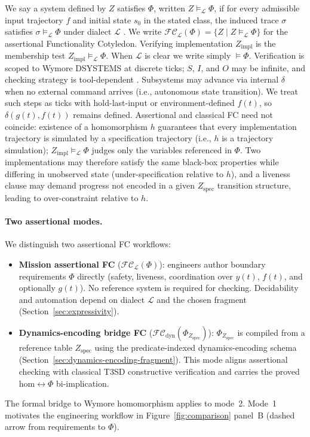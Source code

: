 We say a system defined by $Z$ satisfies $\Phi$, written $Z \models_{\mathcal{L}} \Phi$, if for every admissible input trajectory $f$ and initial state $s_0$ in the stated class, the induced trace $\sigma$ satisfies $\sigma \models_{\mathcal{L}} \Phi$ under dialect $\mathcal{L}$ \parencite{Pnueli1977,BaierKatoen2008}. We write $\mathcal{FC}_{\mathcal{L}}(\Phi) = \{ Z \mid Z \models_{\mathcal{L}} \Phi \}$ for the assertional Functionality Cotyledon. Verifying implementation $Z_{\text{impl}}$ is the membership test $Z_{\text{impl}} \models_{\mathcal{L}} \Phi$. When $\mathcal{L}$ is clear we write simply $\models \Phi$. Verification is scoped to Wymore DSYSTEMS at discrete ticks; $S$, $I$, and $O$ may be infinite, and checking strategy is tool-dependent \parencite{Wymore1993,BaierKatoen2008}. Subsystems may advance via internal $\delta$ when no external command arrives (i.e., autonomous state transition).  We treat such steps as ticks with hold-last-input or environment-defined $f(t)$, so $\delta(g(t), f(t))$ remains defined. Assertional and classical FC need not coincide: existence of a homomorphism $h$ guarantees that every implementation trajectory is simulated by a specification trajectory (i.e., $h$ is a trajectory simulation); $Z_{\text{impl}} \models_{\mathcal{L}} \Phi$ judges only the variables referenced in $\Phi$. Two implementations may therefore satisfy the same black-box properties while differing in unobserved state (under-specification relative to $h$), and a liveness clause may demand progress not encoded in a given $Z_{\text{spec}}$ transition structure, leading to over-constraint relative to $h$.

\paragraph{Two assertional modes.}
\label{sec:assertional-modes}
We distinguish two assertional FC workflows:
\begin{itemize}
    \item \textbf{Mission assertional FC} ($\mathcal{FC}_{\mathcal{L}}(\Phi)$): engineers author boundary requirements $\Phi$ directly (safety, liveness, coordination over $y(t)$, $f(t)$, and optionally $g(t)$). No reference system is required for checking. Decidability and automation depend on dialect $\mathcal{L}$ and the chosen fragment (Section~\ref{sec:expressivity}).
    \item \textbf{Dynamics-encoding bridge FC} ($\mathcal{FC}_{\mathrm{dyn}}(\Phi_{Z_{\text{spec}}})$): $\Phi_{Z_{\text{spec}}}$ is compiled from a reference table $Z_{\text{spec}}$ using the predicate-indexed dynamics-encoding schema (Section~\ref{sec:dynamics-encoding-fragment}). This mode aligns assertional checking with classical T3SD constructive verification and carries the proved hom$\leftrightarrow\Phi$ bi-implication.
\end{itemize}
The formal bridge to Wymore homomorphism applies to mode~2. Mode~1 motivates the engineering workflow in Figure~\ref{fig:comparison} panel~B (dashed arrow from requirements to $\Phi$).

